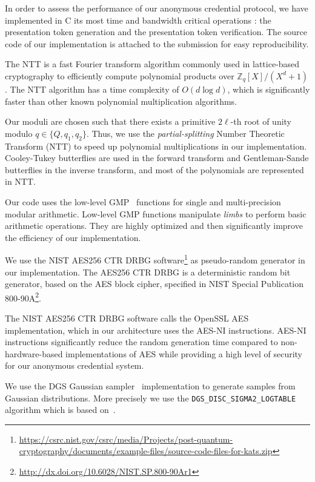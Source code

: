 In order to assess the performance of our anonymous credential protocol, we have implemented in C its most time and bandwidth critical operations : the presentation token generation and the presentation token verification. The source code of our implementation is attached to the submission for easy reproducibility.

The NTT is a fast Fourier transform algorithm commonly used in lattice-based cryptography to efficiently compute polynomial products over $\mathbb{Z}_q[X]/(X^d+1)$. The NTT algorithm has a time complexity of $O(d \log d)$, which is significantly faster than other known polynomial multiplication algorithms.

Our moduli are chosen such that there exists a primitive $2\ell$-th root of unity modulo $q \in \{Q, q_1, q_2\}$. Thus, we use the \emph{partial-splitting} Number Theoretic Transform (NTT) to speed up polynomial multiplications in our implementation. Cooley-Tukey butterflies are used in the forward transform and Gentleman-Sande butterflies in the inverse transform, and most of the polynomials are represented in NTT.

Our code uses the low-level GMP~\cite{gmp} functions for single and multi-precision modular arithmetic. Low-level GMP functions manipulate \emph{limbs} to perform basic arithmetic operations. They are highly optimized and then significantly improve the efficiency of our implementation.

We use the NIST AES256 CTR DRBG software\footnote{\url{https://csrc.nist.gov/csrc/media/Projects/post-quantum-cryptography/documents/example-files/source-code-files-for-kats.zip}} as pseudo-random generator in our implementation. The AES256 CTR DRBG is a deterministic random bit generator, based on the AES block cipher, specified in NIST Special Publication 800-90A\footnote{\url{http://dx.doi.org/10.6028/NIST.SP.800-90Ar1}}.

The NIST AES256 CTR DRBG software calls the OpenSSL AES implementation, which in our architecture uses the AES-NI instructions. AES-NI instructions significantly reduce the random generation time compared to non-hardware-based implementations of AES while providing a high level of security for our anonymous credential system.

We use the DGS Gaussian sampler~\cite{dgs} implementation to generate samples from Gaussian distributions. More precisely we use the \texttt{DGS\_DISC\_SIGMA2\_LOGTABLE} algorithm which is based on~\cite[Algorithm 12]{C:DDLL13}.

